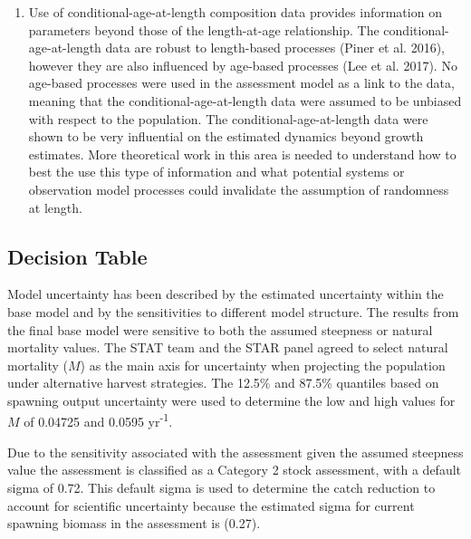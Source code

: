 \documentclass[12pt,]{article}
\begin{document}
\begin{enumerate}
\item Use of conditional-age-at-length composition data provides information on parameters beyond those of the length-at-age relationship. The conditional-age-at-length data are robust to length-based processes (Piner et al. 2016), however they are also influenced by age-based processes (Lee et al. 2017). No age-based processes were used in the assessment model as a link to the data, meaning that the conditional-age-at-length data were assumed to be unbiased with respect to the population. The conditional-age-at-length data were shown to be very influential on the estimated dynamics beyond growth estimates. More theoretical work in this area is needed to understand how to best the use this type of information and what potential systems or observation model processes could invalidate the assumption of randomness at length.

\end{enumerate}

\subsection*{Decision Table}\label{decision-table}

Model uncertainty has been described by the estimated uncertainty within
the base model and by the sensitivities to different model structure.
The results from the final base model were sensitive to both the assumed
steepness or natural mortality values. The STAT team and the STAR panel
agreed to select natural mortality (\(M\)) as the main axis for
uncertainty when projecting the population under alternative harvest
strategies. The 12.5\% and 87.5\% quantiles based on spawning output
uncertainty were used to determine the low and high values for \(M\) of
0.04725 and 0.0595 yr\textsuperscript{-1}.

Due to the sensitivity associated with the assessment given the assumed
steepness value the assessment is classified as a Category 2 stock
assessment, with a default sigma of 0.72. This default sigma is used to
determine the catch reduction to account for scientific uncertainty
because the estimated sigma for current spawning biomass in the
assessment is (0.27).
\end{document}
